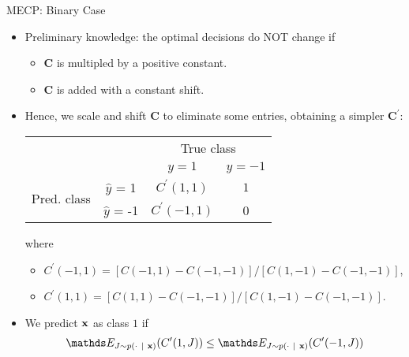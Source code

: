 \documentclass[11pt,compress,t,notes=noshow, xcolor=table]{beamer}
\begin{document}
\begin{vbframe}{MECP: Binary Case}
	\footnotesize{
		\begin{itemize}
            \footnotesize
            \item Preliminary knowledge: the optimal decisions do NOT change if 
            \begin{itemize}
                \footnotesize
                \item $\mathbf{C}$ is multipled by a positive constant.
                \item $\mathbf{C}$ is added with a constant shift.
            \end{itemize}

            \item Hence, we scale and shift $\mathbf{C}$ to eliminate some entries, obtaining a simpler $\mathbf{C}^\prime$: 
            \begin{table}[]
                \centering
                    \begin{tabular}{cc|cc}
        			& &\multicolumn{2}{c}{True class} \\
        			& & $y=1$ & $y=-1$  \\
        			\hline
        			\multirow{2}{*}{\parbox{0.3cm}{Pred.  class}} & $\hat y$ = 1 & $C^\prime(1,1)$ & $1$ \\
        			& $\hat y$ = -1 & $C^\prime(-1, 1)$ & 0\\
                \end{tabular}
            \end{table}
            where 
            \begin{itemize}
                \footnotesize
                \item $C^\prime (-1, 1) = [C(-1, 1) - C(-1, -1)] / [C(1, -1) - C(-1, -1)]$,
                \item $C^\prime (1, 1) = [C(1, 1) - C(-1, -1)] / [C(1, -1) - C(-1,-1)]$.
            \end{itemize}

            \item We predict $\mathbf{x}$ as class $1$ if \\
            \begin{align*}
                \E_{J \sim p(\cdot ~|~ \xv)}( C^\prime(1,J) )  \leq \E_{J \sim p(\cdot ~|~ \xv)}( C^\prime(-1,J) ) \\
            \end{align*}


\end{itemize}}
\end{vbframe}
\end{document}
